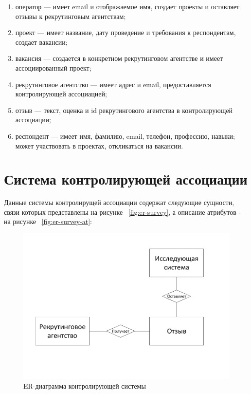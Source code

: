 \begin{enumerate}
\item оператор — имеет email и отображаемое имя, создает проекты и оставляет отзывы к рекрутинговым агентствам;
\item проект — имеет название, дату проведение и требования к респондентам, создает вакансии;
\item вакансия — создается в конкретном рекрутинговом агентстве и имеет ассоциированный проект;
\item рекрутинговое агентство — имеет адрес и email, предоставляется контролирующей ассоциацией;
\item отзыв — текст, оценка и id рекрутингового агентства в контролирующей ассоциации;
\item респондент — имеет имя, фамилию, email, телефон, профессию, навыки; может участвовать в проектах, откликаться на вакансии.
\end{enumerate}

\section{Система контролирующей ассоциации}
Данные системы контролирущей ассоциации содержат следующие сущности, связи которых представлены на рисунке ~\ref{fig:er-survey}, а описание атрибутов - на рисунке ~\ref{fig:er-survey-at}:

\begin{figure}[ht]
  \centering
  \includegraphics[width=\textwidth]{include/er-supervising.pdf}
\caption{ER-диаграмма контролирующей системы}
\label{fig:er-supervising}
\end{figure}

